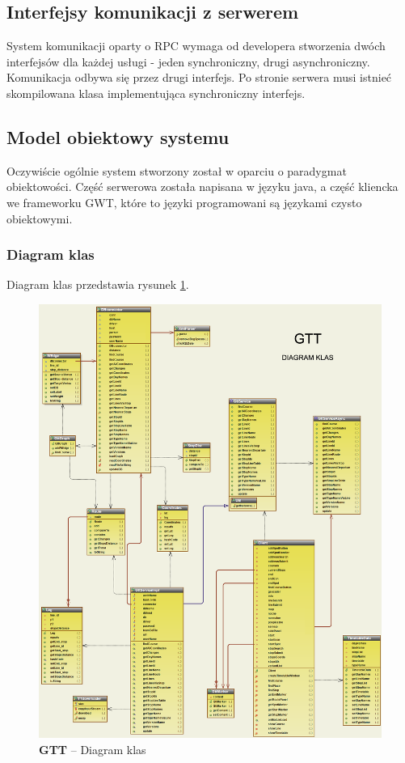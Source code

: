 \documentclass[a4paper,12pt]{article}
\begin{document}
\subsection{Interfejsy komunikacji z serwerem}
System komunikacji oparty o RPC wymaga od developera stworzenia dwóch interfejsów
dla każdej usługi - jeden synchroniczny, drugi asynchroniczny. Komunikacja
odbywa się przez drugi interfejs. Po stronie serwera musi istnieć skompilowana
klasa implementująca synchroniczny interfejs.

\subsection{Model obiektowy systemu}
Oczywiście ogólnie system stworzony został w oparciu o paradygmat obiektowości.
Część serwerowa została napisana w języku java, a część kliencka we frameworku GWT,
które to języki programowani są językami czysto obiektowymi. 

\subsubsection{Diagram klas}

Diagram klas przedstawia rysunek \ref{diagram_klas}.

 \begin{figure}[htp]
\centering
\includegraphics[width=\textwidth]{diagram_klas} 
\caption{\textbf{GTT} -- Diagram klas}\label{diagram_klas}
\end{figure}
\end{document}
